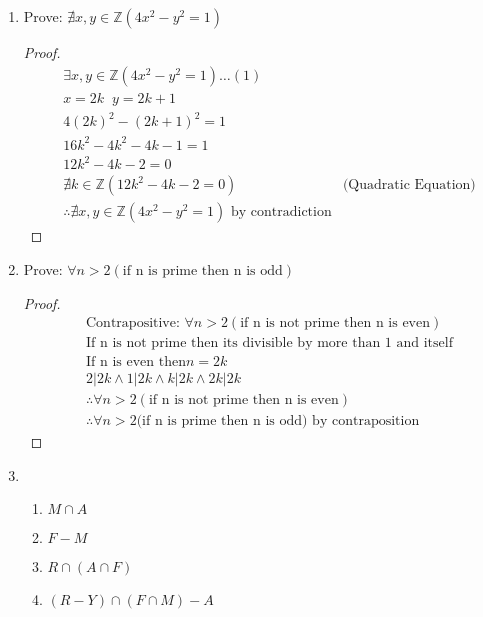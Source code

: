 \documentclass[11pt]{article}
\begin{document}
\begin{enumerate}
    \item Prove: $ \nexists x,y \in \mathbb{Z} (4x^2 - y^2 = 1)$
        \begin{proof}
            \begin{align*}
                & \exists x,y \in \mathbb{Z} (4x^2 - y^2 = 1) \dots (1) \\
                & x = 2k \;\; y = 2k + 1 \\
                & 4(2k)^2 - (2k+1)^2 = 1 \\
                & 16k^2 - 4k^2 - 4k - 1 = 1 \\
                & 12k^2 - 4k - 2 = 0 \\
                & \nexists k \in \mathbb{Z} (12k^2 - 4k - 2 = 0) & \text{(Quadratic Equation)}\\
                & \therefore \nexists x,y \in \mathbb{Z} (4x^2 - y^2 = 1) \text{ by contradiction}
            \end{align*}
        \end{proof}

    \item Prove: $ \forall n > 2 (\text{if n is prime then n is odd}) $
        \begin{proof}
            \begin{align*}
                & \text{Contrapositive: }\forall n > 2(\text{if n is not prime then n is even}) \\
                & \text{If n is not prime then its divisible by more than 1 and itself} \\
                & \text{If n is even then} n = 2k \\
                & 2 | 2k \wedge 1 | 2k \wedge k | 2k \wedge 2k | 2k\\
                & \therefore \forall n > 2(\text{if n is not prime then n is even}) \\
                & \therefore \forall n > 2 (\text{if n is prime then n is odd) by contraposition}
            \end{align*}
        \end{proof}
    
    \newpage

    \item
        \begin{enumerate}
            \item $M \cap A$
            \item $F - M$
            \item $R \cap (A \cap F)$
            \item $(R - Y) \cap (F \cap M) - A$
        \end{enumerate}
    

\end{enumerate}
\end{document}
